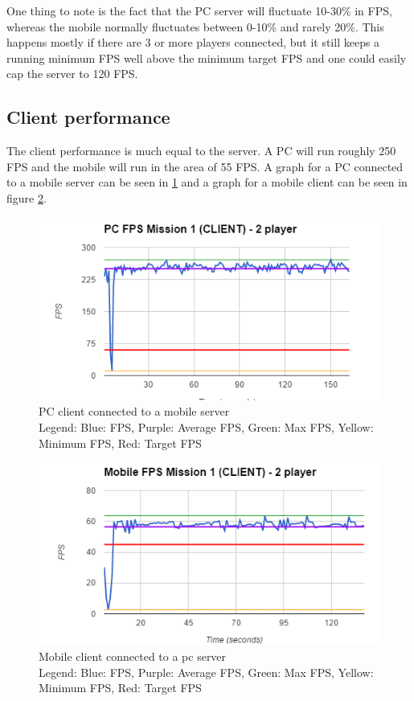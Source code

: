 One thing to note is the fact that the PC server will fluctuate 10-30\%  in FPS, whereas the mobile normally fluctuates between 0-10\% and rarely 20\%. 
This happens mostly if there are 3 or more players connected, but it still keeps a running minimum FPS well above the minimum target FPS and one could easily cap the server to 120 FPS.

\subsection*{Client performance}
The client performance is much equal to the server. A PC will run roughly 250 FPS and the mobile will run in the area of 55 FPS. A graph for a PC connected to a mobile server can be seen in \ref{test:performance:pcclientmobileserver} and a graph for a mobile client can be seen in figure \ref{test:performance:mobileclientpcserver}.

\begin{figure}
    \includegraphics{figures/test/PCClient2Player}
    \caption{PC client connected to a mobile server \\ Legend: Blue: FPS, Purple: Average FPS, Green: Max FPS, Yellow: Minimum FPS, Red: Target FPS}
    \label{test:performance:pcclientmobileserver}
\end{figure}

\begin{figure}
    \includegraphics{figures/test/MobileClient2Player}
    \caption{Mobile client connected to a pc server \\ Legend: Blue: FPS, Purple: Average FPS, Green: Max FPS, Yellow: Minimum FPS, Red: Target FPS}
    \label{test:performance:mobileclientpcserver}
\end{figure}

